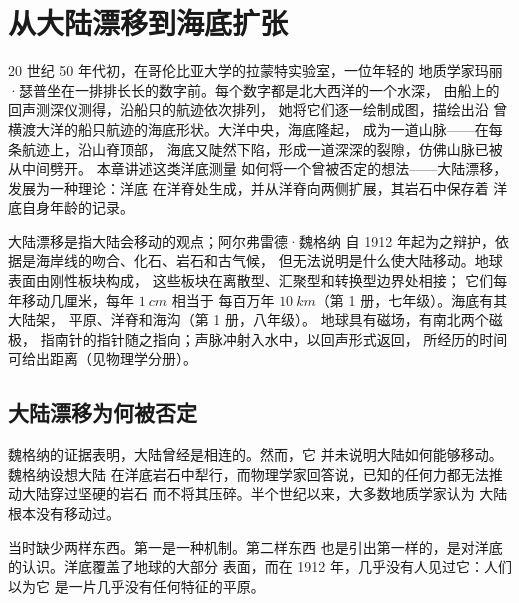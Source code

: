 \chapter{从大陆漂移到海底扩张}\label{ch:g11:drift-to-spreading}

20 世纪 50 年代初，在哥伦比亚大学的拉蒙特实验室，一位年轻的
地质学家玛丽·瑟普坐在一排排长长的数字前。每个数字都是北大西洋的一个水深，
由船上的回声测深仪测得，沿船只的航迹依次排列，
她将它们逐一绘制成图，描绘出沿
曾横渡大洋的船只航迹的海底形状。大洋中央，海底隆起，
成为一道山脉——在每条航迹上，沿山脊顶部，
海底又陡然下陷，形成一道深深的裂隙，仿佛山脉已被从中间劈开。
本章讲述这类洋底测量
如何将一个曾被否定的想法——大陆漂移，发展为一种理论：洋底
在洋脊处生成，并从洋脊向两侧扩展，其岩石中保存着
洋底自身年龄的记录。

\begin{recall}
大陆漂移是指大陆会移动的观点；阿尔弗雷德·魏格纳
自 1912 年起为之辩护，依据是海岸线的吻合、化石、岩石和古气候，
但无法说明是什么使大陆移动。地球表面由刚性板块构成，
这些板块在离散型、汇聚型和转换型边界处相接；
它们每年移动几厘米，每年 $\qty{1}{cm}$ 相当于
每百万年 $\qty{10}{km}$（第 1 册，七年级）。海底有其大陆架，
平原、洋脊和海沟（第 1 册，八年级）。
地球具有磁场，有南北两个磁极，
指南针的指针随之指向；声脉冲射入水中，以回声形式返回，
所经历的时间可给出距离（见物理学分册）。
\end{recall}

\section{大陆漂移为何被否定}

魏格纳的证据表明，大陆曾经是相连的。然而，它
并未说明大陆如何能够移动。魏格纳设想大陆
在洋底岩石中犁行，而物理学家回答说，已知的任何力都无法推动大陆穿过坚硬的岩石
而不将其压碎。半个世纪以来，大多数地质学家认为
大陆根本没有移动过。

当时缺少两样东西。第一是一种机制。第二样东西
也是引出第一样的，是对洋底的认识。洋底覆盖了地球的大部分
表面，而在 1912 年，几乎没有人见过它：人们以为它
是一片几乎没有任何特征的平原。

